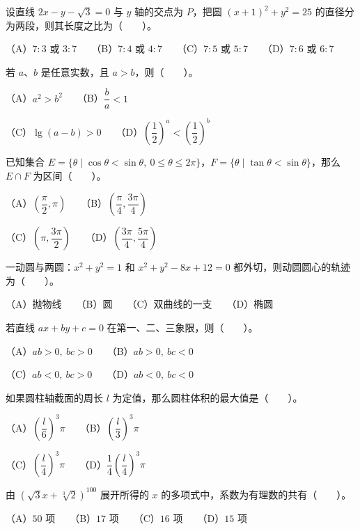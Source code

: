 \begin{question}
设直线 $2x-y-\sqrt3=0$ 与 $y$ 轴的交点为 $P$，把圆 $(x+1)^2+y^2=25$ 的直径分为两段，则其长度之比为\mbox{（　　）}。

（A）$7:3$ 或 $3:7$　　（B）$7:4$ 或 $4:7$　　（C）$7:5$ 或 $5:7$　　（D）$7:6$ 或 $6:7$

\end{question}
\begin{question}
若 $a\text{、}b$ 是任意实数，且 $a>b$，则\mbox{（　　）}。

（A）$a^2>b^2$　　（B）$\dfrac ba<1$

（C）$\lg(a-b)>0$　　（D）$\left(\dfrac12\right)^a<\left(\dfrac12\right)^b$

\end{question}
\begin{question}
已知集合 $E=\{\theta\mid \cos\theta<\sin\theta,\ 0\le\theta\le2\pi\}$，$F=\{\theta\mid\tan\theta<\sin\theta\}$，那么 $E\cap F$ 为区间\mbox{（　　）}。

（A）$\left(\dfrac\pi2,\pi\right)$　　（B）$\left(\dfrac\pi4,\dfrac{3\pi}4\right)$

（C）$\left(\pi,\dfrac{3\pi}2\right)$　　（D）$\left(\dfrac{3\pi}4,\dfrac{5\pi}4\right)$

\end{question}
\begin{question}
一动圆与两圆：$x^2+y^2=1$ 和 $x^2+y^2-8x+12=0$ 都外切，则动圆圆心的轨迹为\mbox{（　　）}。

（A）抛物线　　（B）圆　　（C）双曲线的一支　　（D）椭圆

\end{question}
\begin{question}
若直线 $ax+by+c=0$ 在第一、二、三象限，则\mbox{（　　）}。

（A）$ab>0,\ bc>0$　　（B）$ab>0,\ bc<0$

（C）$ab<0,\ bc>0$　　（D）$ab<0,\ bc<0$

\end{question}
\begin{question}
如果圆柱轴截面的周长 $l$ 为定值，那么圆柱体积的最大值是\mbox{（　　）}。

（A）$\left(\dfrac l6\right)^3\pi$　　（B）$\left(\dfrac l3\right)^3\pi$

（C）$\left(\dfrac l4\right)^3\pi$　　（D）$\dfrac14\left(\dfrac l4\right)^3\pi$

\end{question}
\begin{question}
由 $(\sqrt3x+\sqrt[3]2)^{100}$ 展开所得的 $x$ 的多项式中，系数为有理数的共有\mbox{（　　）}。

（A）$50$ 项　　（B）$17$ 项　　（C）$16$ 项　　（D）$15$ 项

\end{question}
